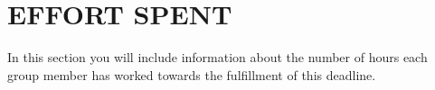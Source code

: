 \section{EFFORT SPENT}
In  this  section  you  will  include  information  about  the  number  of  hours  each  group  member  has worked towards the fulfillment of this deadline. 